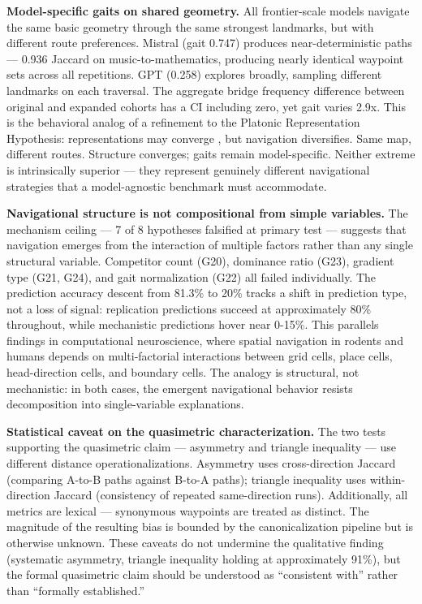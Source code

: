 \textbf{Model-specific gaits on shared geometry.} All frontier-scale models navigate the same basic geometry through the same strongest landmarks, but with different route preferences. Mistral (gait 0.747) produces near-deterministic paths --- 0.936 Jaccard on music-to-mathematics, producing nearly identical waypoint sets across all repetitions. GPT (0.258) explores broadly, sampling different landmarks on each traversal. The aggregate bridge frequency difference between original and expanded cohorts has a CI including zero, yet gait varies 2.9x. This is the behavioral analog of a refinement to the Platonic Representation Hypothesis: representations may converge \citep{huh2024platonic}, but navigation diversifies. Same map, different routes. Structure converges; gaits remain model-specific. Neither extreme is intrinsically superior --- they represent genuinely different navigational strategies that a model-agnostic benchmark must accommodate.

\textbf{Navigational structure is not compositional from simple variables.} The mechanism ceiling --- 7 of 8 hypotheses falsified at primary test --- suggests that navigation emerges from the interaction of multiple factors rather than any single structural variable. Competitor count (G20), dominance ratio (G23), gradient type (G21, G24), and gait normalization (G22) all failed individually. The prediction accuracy descent from 81.3\% to 20\% tracks a shift in prediction type, not a loss of signal: replication predictions succeed at approximately 80\% throughout, while mechanistic predictions hover near 0-15\%. This parallels findings in computational neuroscience, where spatial navigation in rodents and humans depends on multi-factorial interactions between grid cells, place cells, head-direction cells, and boundary cells. The analogy is structural, not mechanistic: in both cases, the emergent navigational behavior resists decomposition into single-variable explanations.

\textbf{Statistical caveat on the quasimetric characterization.} The two tests supporting the quasimetric claim --- asymmetry and triangle inequality --- use different distance operationalizations. Asymmetry uses cross-direction Jaccard (comparing A-to-B paths against B-to-A paths); triangle inequality uses within-direction Jaccard (consistency of repeated same-direction runs). Additionally, all metrics are lexical --- synonymous waypoints are treated as distinct. The magnitude of the resulting bias is bounded by the canonicalization pipeline but is otherwise unknown. These caveats do not undermine the qualitative finding (systematic asymmetry, triangle inequality holding at approximately 91\%), but the formal quasimetric claim should be understood as ``consistent with'' rather than ``formally established.''

